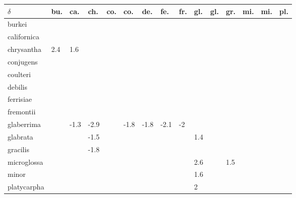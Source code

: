 \begin{table}[ht]
\centering
\begin{tabular}{lllllllllllllll}
  \hline
$\delta$ & bu. & ca. & ch. & co. & co. & de. & fe. & fr. & gl. & gl. & gr. & mi. & mi. & pl. \\ 
  \hline
burkei &  &  &  &  &  &  &  &  &  &  &  &  &  &  \\ 
  californica &  &  &  &  &  &  &  &  &  &  &  &  &  &  \\ 
  chrysantha & 2.4 & 1.6 &  &  &  &  &  &  &  &  &  &  &  &  \\ 
  conjugens &  &  &  &  &  &  &  &  &  &  &  &  &  &  \\ 
  coulteri &  &  &  &  &  &  &  &  &  &  &  &  &  &  \\ 
  debilis &  &  &  &  &  &  &  &  &  &  &  &  &  &  \\ 
  ferrisiae &  &  &  &  &  &  &  &  &  &  &  &  &  &  \\ 
  fremontii &  &  &  &  &  &  &  &  &  &  &  &  &  &  \\ 
  glaberrima &  & -1.3 & -2.9 &  & -1.8 & -1.8 & -2.1 & -2 &  &  &  &  &  &  \\ 
  glabrata &  &  & -1.5 &  &  &  &  &  & 1.4 &  &  &  &  &  \\ 
  gracilis &  &  & -1.8 &  &  &  &  &  &  &  &  &  &  &  \\ 
  microglossa &  &  &  &  &  &  &  &  & 2.6 &  & 1.5 &  &  &  \\ 
  minor &  &  &  &  &  &  &  &  & 1.6 &  &  &  &  &  \\ 
  platycarpha &  &  &  &  &  &  &  &  & 2 &  &  &  &  &  \\ 
   \hline
\end{tabular}
\end{table}
